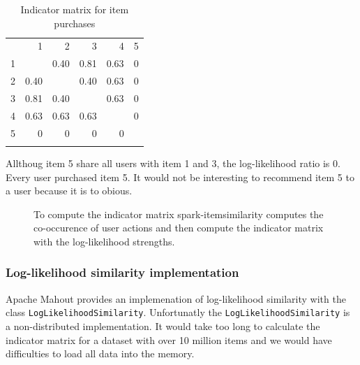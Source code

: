 \begin{table}
  \centering
\begin{center}
\begin{tabular}{rrrrrr}
  & 1 & 2 & 3 & 4 & 5\\
1 &   & 0.40 & 0.81 & 0.63 & 0\\
2 & 0.40 &  & 0.40 & 0.63 & 0\\
3 & 0.81 & 0.40 &  & 0.63 & 0\\
4 & 0.63 & 0.63 & 0.63 &  & 0\\
5 & 0 & 0 & 0 & 0 & \\
 &  &  &  &  & \\
\end{tabular}
\end{center}
  \caption{Indicator matrix for item purchases}
  \label{tab:indicatormatrix}
\end{table}

Allthoug item 5 share all users with item 1 and 3, the log-likelihood ratio is 0. Every user purchased item 5. It would not be interesting to recommend item 5 to a user because it is to obious.

\begin{figure}
\centering
{}
\caption{To compute the indicator matrix {\ttfamily spark-itemsimilarity} computes the co-occurence  of user actions and then compute the indicator matrix with the log-likelihood strengths.}
\end{figure}


\subsubsection{Log-likelihood similarity implementation}
\label{sec:llrimpl}

Apache Mahout provides an implemenation of log-likelihood similarity with the class \verb|LogLikelihoodSimilarity|. Unfortunatly the \verb|LogLikelihoodSimilarity| is a non-distributed implementation. It would take too long to calculate the indicator matrix for a dataset with over 10 million items and we would have difficulties to load all data into the memory. 


